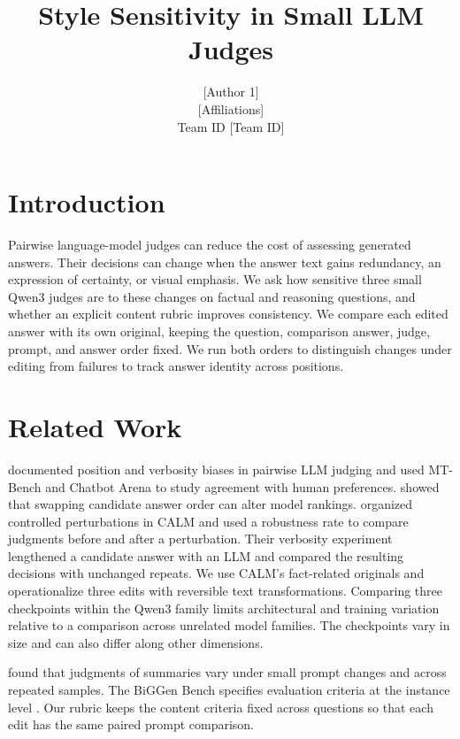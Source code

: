 \documentclass[11pt]{article}
\title{Style Sensitivity in Small LLM Judges}
\author{[Author 1] \quad [Author 2] \quad [Author 3] \quad [Author 4] \\
        {[Affiliations]} \\
        Team ID [Team ID]}
\begin{document}
\maketitle

\begin{abstract}

\end{abstract}

\section{Introduction}
Pairwise language-model judges can reduce the cost of assessing generated
answers. Their decisions can change when the answer text gains redundancy,
an expression of certainty, or visual emphasis. We ask how sensitive three
small Qwen3 judges are to these changes on factual and reasoning questions,
and whether an explicit content rubric improves consistency. We compare
each edited answer with its own original, keeping the question, comparison
answer, judge, prompt, and answer order fixed. We run both orders to
distinguish changes under editing from failures to track answer identity
across positions.

\section{Related Work}
\citet{zheng2023mtbench} documented position and verbosity biases in pairwise
LLM judging and used MT-Bench and Chatbot Arena to study agreement with human
preferences. \citet{wang2024fair} showed that swapping candidate answer order
can alter model rankings. \citet{ye2025calm} organized controlled perturbations
in CALM and used a robustness rate to compare judgments before and after a
perturbation.
Their verbosity experiment lengthened a candidate answer with an LLM and
compared the resulting decisions with unchanged repeats. We use CALM's
fact-related originals and operationalize three edits with reversible text
transformations. Comparing three checkpoints within the Qwen3 family
\citep{yang2025qwen3} limits architectural and training variation relative to
a comparison across unrelated model families. The checkpoints vary in size
and can also differ along other dimensions.

\citet{stureborg2024inconsistent} found that judgments of summaries vary
under small prompt changes and across repeated samples. The BiGGen Bench
specifies evaluation criteria at the instance level \citep{kim2025biggen}.
Our rubric keeps the content criteria fixed across questions so that each
edit has the same paired prompt comparison.
\end{document}
